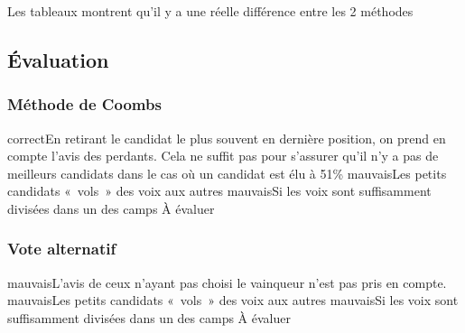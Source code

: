 \documentclass[../report]{subfiles}
\begin{document}
  Les tableaux  montrent qu'il y a une réelle différence entre les 2 méthodes

  \subsection{Évaluation}
  \subsubsection{Méthode de Coombs}
  \tabcritere%
    {correct}{En retirant le candidat le plus souvent en dernière position, on prend en compte l'avis des perdants. Cela ne suffit pas pour s'assurer qu'il n'y a pas de meilleurs candidats dans le cas où un candidat est élu à 51\%}%
    {mauvais}{Les petits candidats «~vols~» des voix aux autres}%
    {mauvais}{Si les voix sont suffisamment divisées dans un des camps}%
    {À évaluer}{}
  \subsubsection{Vote alternatif}
  \tabcritere%
    {mauvais}{L'avis de ceux n'ayant pas choisi le vainqueur n'est pas pris en compte.}%
    {mauvais}{Les petits candidats «~vols~» des voix aux autres}%
    {mauvais}{Si les voix sont suffisamment divisées dans un des camps}%
    {À évaluer}{}


  
\end{document}
